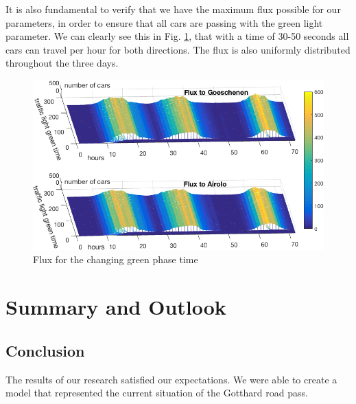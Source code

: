 \documentclass[11pt,a4paper,parskip=half-]{article}
\begin{document}
\clearpage

It is also fundamental to verify that we have the maximum flux possible for our parameters, in order to ensure that all cars are passing with the green light parameter. We can clearly see this in Fig. \ref{fig:2}, that with a time of 30-50 seconds all cars can travel per hour for both directions. The flux is also uniformly distributed throughout the three days. 

\vspace{2cm}

\begin{figure}[h!]
\includegraphics[scale=0.65]{fourth}
\centering
\vspace*{-4mm}
\caption{Flux for the changing green phase time}
\label{fig:2}
\end{figure}


\clearpage






\section{Summary and Outlook}


\subsection{Conclusion}
The results of our research satisfied our expectations. We were able to create a model that represented the current situation of the Gotthard road pass. 
\end{document}
